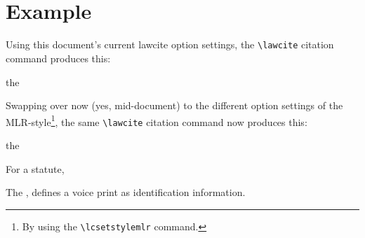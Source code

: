 
\lcsetdemoon
\maketitle
\begin{abstract}
\myabstracttext
\end{abstract}
\comment{{\ack}}
\newpage
\tableofcontents
\bigskip
\hfill{}\hfill\ %
\listoffigures
\listoftables
\bigskip
\hfill{}\hfill\ %
\bigskip
\newpage
\iftoggle{printlegtoc}{%
\let\oldtwocolumn\twocolumn
\renewcommand{\twocolumn}[1][]{#1}
\let\oldclearpage\clearpage
\renewcommand\clearpage{\relax}
\printindex[cases]
\printindex[legislation]
\iftoggle{printregulations}{\printindex[regulations]}{}
\renewcommand{\twocolumn}[1][]{\oldtwocolumn}
\renewcommand\clearpage{\oldclearpage}
}{}
\bigskip
\hfill{}\hfill\ %
\bigskip


\newpage
\section{Example}
Using this document's current lawcite option settings, the \texttt{\textbackslash lawcite} citation command produces this:

\begin{mdframed}[default]
the 
\end{mdframed}
\bigskip
Swapping over now (yes, mid-document) to the different option settings of the MLR-style\footnote{By using the \texttt{\textbackslash lcsetstylemlr} command.}, the same \texttt{\textbackslash lawcite} citation command now produces this:

\lcsetstylemlr
\begin{mdframed}[default]
the  
\end{mdframed}
\bigskip
\lcsetstyledefault

For a statute, 

\begin{mdframed}[default]
The , defines a voice print as identification information.
\end{mdframed}
\bigskip


